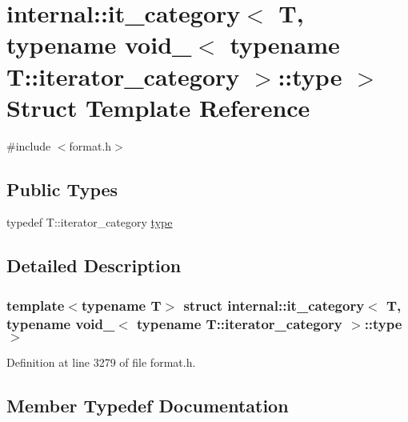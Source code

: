 \hypertarget{structinternal_1_1it__category_3_01_t_00_01typename_01void___3_01typename_01_t_1_1iterator__category_01_4_1_1type_01_4}{}\section{internal\+:\+:it\+\_\+category$<$ T, typename void\+\_\+$<$ typename T\+:\+:iterator\+\_\+category $>$\+:\+:type $>$ Struct Template Reference}
\label{structinternal_1_1it__category_3_01_t_00_01typename_01void___3_01typename_01_t_1_1iterator__category_01_4_1_1type_01_4}


{\ttfamily \#include $<$format.\+h$>$}

\subsection*{Public Types}
\begin{DoxyCompactItemize}
\item 
typedef T\+::iterator\+\_\+category \hyperlink{structinternal_1_1it__category_3_01_t_00_01typename_01void___3_01typename_01_t_1_1iterator__category_01_4_1_1type_01_4_a3e5e3f4c205fb38b9a49c2205c62e336}{type}
\end{DoxyCompactItemize}


\subsection{Detailed Description}
\subsubsection*{template$<$typename T$>$\newline
struct internal\+::it\+\_\+category$<$ T, typename void\+\_\+$<$ typename T\+::iterator\+\_\+category $>$\+::type $>$}



Definition at line 3279 of file format.\+h.



\subsection{Member Typedef Documentation}
\mbox{\label{structinternal_1_1it__category_3_01_t_00_01typename_01void___3_01typename_01_t_1_1iterator__category_01_4_1_1type_01_4_a3e5e3f4c205fb38b9a49c2205c62e336}} 
